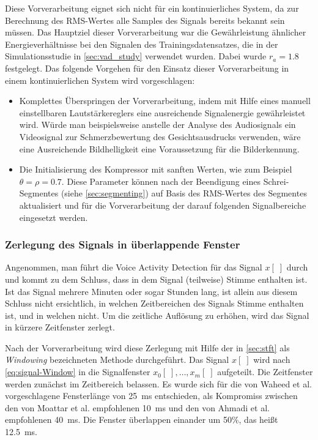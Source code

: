 Diese Vorverarbeitung eignet sich nicht für ein kontinuierliches System, da zur Berechnung des RMS-Wertes alle Samples des Signals bereits bekannt sein müssen. Das Hauptziel dieser Vorverarbeitung war die Gewährleistung ähnlicher Energieverhältnisse bei den Signalen des Trainingsdatensatzes, die in der Simulationsstudie in \autoref{sec:vad_study} verwendet wurden. Dabei wurde $r_a = 1.8$ festgelegt. Das folgende Vorgehen für den Einsatz dieser Vorverarbeitung in einem kontinuierlichen System wird vorgeschlagen:
\begin{itemize}
	\item Komplettes Überspringen der Vorverarbeitung, indem mit Hilfe eines manuell einstellbaren Lautstärkereglers eine ausreichende Signalenergie gewährleistet wird. Würde man beispielsweise anstelle der Analyse des Audiosignals ein Videosignal zur Schmerzbewertung des Gesichtsausdrucks verwenden, wäre eine Ausreichende Bildhelligkeit eine Voraussetzung für die Bilderkennung.
	\item Die Initialisierung des Kompressor mit \grqq sanften Werten\grqq , wie zum Beispiel $\theta = \rho = 0.7$. Diese Parameter können nach der Beendigung eines Schrei-Segmentes (siehe \autoref{sec:segmenting}) auf Basis des RMS-Wertes des Segmentes aktualisiert und für die Vorverarbeitung der darauf folgenden Signalbereiche eingesetzt werden.
\end{itemize}

\subsubsection{Zerlegung des Signals in überlappende Fenster}
\label{sec:windowing}

Angenommen, man führt die Voice Activity Detection für das Signal $x[\;]$ durch und kommt zu dem Schluss, dass in dem Signal (teilweise) Stimme enthalten ist. Ist das Signal mehrere Minuten oder sogar Stunden lang, ist allein aus diesem Schluss nicht ersichtlich, in welchen Zeitbereichen des Signals Stimme enthalten ist, und in welchen nicht. Um die zeitliche Auflösung zu erhöhen, wird das Signal in kürzere Zeitfenster zerlegt.

Nach der Vorverarbeitung wird diese Zerlegung mit Hilfe der in \autoref{sec:stft} als \emph{Windowing} bezeichneten Methode durchgeführt. Das Signal $x[\;]$ wird nach \autoref{eq:signal-Window} in die Signalfenster $x_0[\;] , \ldots , x_m[\;]$ aufgeteilt. Die Zeitfenster werden zunächst im Zeitbereich belassen. Es wurde sich für die von Waheed et al. \cite{vad_entropy} vorgeschlagene Fensterlänge von \SI{25}{\milli\second} entschieden, als Kompromiss zwischen den von Moattar et al. \cite{vad_Easy} empfohlenen \SI{10}{\milli\second} und den von Ahmadi et al. \cite{vad_ceps} empfohlenen \SI{40}{\milli\second}. Die Fenster überlappen einander um 50\%, das heißt \SI{12.5}{\milli\second}.

